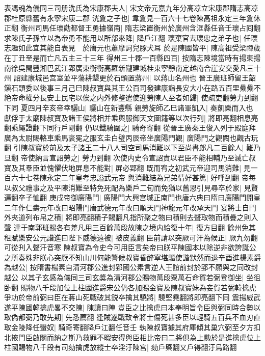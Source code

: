 表馮魂為儀同三司册洗氏為宋康郡夫人|{
	宋文帝元嘉九年分高凉立宋康郡隋志高凉郡杜原縣舊有永寧宋康二郡}
洸夐之子也|{
	韋夐見一百六十七卷陳高祖永定三年夐休正翻}
衡州司馬任瓌勸都督王勇據嶺南|{
	隋志梁置衡州於廣州含洭縣任音壬瓌占囘翻}
求陳氏子孫立以為帝勇不能用以所部來降|{
	降戶江翻}
瓌棄官去瓌忠之弟子也|{
	任瓌志趣如此宜其能自表見　於唐元也蕭摩訶兒豚犬耳}
於是陳國皆平|{
	陳高祖受梁禪歲在丁丑至是而亡凡五主三十三年}
得州三十郡一百縣四百|{
	按隋志陳境當時有揚東揚南徐吳閩豐湘巴武江郢廣東衡衡高羅新隴建城桂東寧靜南定越南合崖安交愛凡三十州}
詔建康城邑宫室並平蕩耕墾更於石頭置蔣州|{
	以蔣山名州也}
晉王廣班師留王韶鎭石頭委以後事三月己巳陳叔寶與其王公百司發建康詣長安大小在路五百里纍纍不絶帝命權分長安士民宅以俟之内外修整遣使迎勞陳人至者如歸|{
	使疏吏翻勞力到翻下同}
夏四月辛亥帝幸驪山|{
	驪山在新豐縣}
親勞旋師乙巳諸軍凱入|{
	奏凱樂而入也}
獻俘于太廟陳叔寶及諸王侯將相并乘輿服御天文圖籍等以次行列|{
	將即亮翻相息亮翻乘繩證翻下同行戶剛翻}
仍以鐵騎圍之|{
	騎奇寄翻}
從晉王廣秦王俊入列于殿庭拜廣為太尉賜輅車乘馬衮冕之服玄圭白璧丙辰帝坐廣陽門觀|{
	廣陽門之觀闕也觀古玩翻}
引陳叔寶於前及太子諸王二十八人司空司馬消難以下至尚書郎凡二百餘人|{
	難乃旦翻}
帝使納言宣詔勞之|{
	勞力到翻}
次使内史令宣詔責以君臣不能相輔乃至滅亡叔寶及其羣臣並愧懼伏地屏息不能對|{
	屏必郢翻}
既而宥之初武元帝迎司馬消難|{
	見一百六十七卷陳永定二年皇考忠謚武元帝}
與消難結為兄弟情好甚篤|{
	好呼到翻}
帝每以叔父禮事之及平陳消難至特免死配為樂戶二旬而免猶以舊恩引見尋卒於家|{
	見賢遍翻卒子恤翻}
庚戌帝御廣陽門|{
	廣陽門大興宫城正南門也唐六典曰隋曰廣陽門開皇二年作仁夀元年改曰昭陽門唐武德元年改曰順天門神龍元年改承天門}
宴將士自門外夾道列布帛之積|{
	將即亮翻積子賜翻凡指所聚之物曰積則去聲取物而積疊之則入聲}
達于南郭班賜各有差凡用三百餘萬段故陳之境内給復十年|{
	復方目翻}
餘州免其租賦樂安公元諧進曰陛下威德遠被|{
	被皮義翻}
臣前請以突厥可汗為候正|{
	厥九勿翻可從刋入聲汗音寒}
陳叔寶為令史今可用臣言矣帝曰朕平陳國本以除逆非欲誇誕公之所奏殊非朕心突厥不知山川何能警候叔寶昏醉寧堪驅使諧默然而退辛酉進楊素爵為越公|{
	按隋書楊素自清河郡公進封郢國公素言逆人王誼前封於郢不願與之同改封越公}
以其子玄感為儀同三司玄奬為清河郡公賜物萬段粟萬石命賀若弼登御坐|{
	坐徂卧翻}
賜物八千段加位上柱國進爵宋公仍各加賜金寶及陳叔寶妹為妾賀若弼韓擒虎爭功於帝前弼曰臣在蔣山死戰破其鋭卒擒其驍將|{
	驍堅堯翻將即亮翻下同}
震揚威武遂平陳國韓擒虎畧不交陳|{
	陳讀曰陣}
豈臣之比擒虎曰本奉明旨令臣與弼同時合勢以取偽都弼乃敢先期|{
	先悉薦翻}
逢賊遂戰致令將士傷死甚多臣以輕騎五百兵不血刃直取金陵降任蠻奴|{
	騎奇寄翻降戶江翻任音壬}
執陳叔寶據其府庫傾其巢穴弼至夕方扣北掖門臣啟關而納之斯乃救罪不暇安得與臣相比帝曰二將俱為上勲於是進擒虎位上柱國賜物八千段有司劾擒虎放縱士卒淫汙陳宫|{
	劾戶槩翻又戶得翻汙烏路翻}
